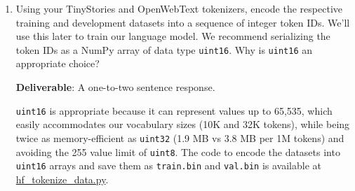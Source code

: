 \begin{enumerate}[label=(\alph*)]
    \item Using your TinyStories and OpenWebText tokenizers, encode the respective training and development datasets into a sequence of integer token IDs. We'll use this later to train our language model. We recommend serializing the token IDs as a NumPy array of data type \lstinline{uint16}. Why is \lstinline{uint16} an appropriate choice?

    \textbf{Deliverable}: A one-to-two sentence response.

    \begin{answer}
    \lstinline{uint16} is appropriate because it can represent values up to 65,535, which easily accommodates our vocabulary sizes (10K and 32K tokens), while being twice as memory-efficient as \lstinline{uint32} (1.9 MB vs 3.8 MB per 1M tokens) and avoiding the 255 value limit of \lstinline{uint8}. The code to encode the datasets into \lstinline{uint16} arrays and save them as \texttt{train.bin} and \texttt{val.bin} is available at \href{https://github.com/donglinkang2021/cs336-assignment1-basics/blob/main/data_utils/hf_tokenize_data.py}{hf\_tokenize\_data.py}.
    \end{answer}
\end{enumerate}